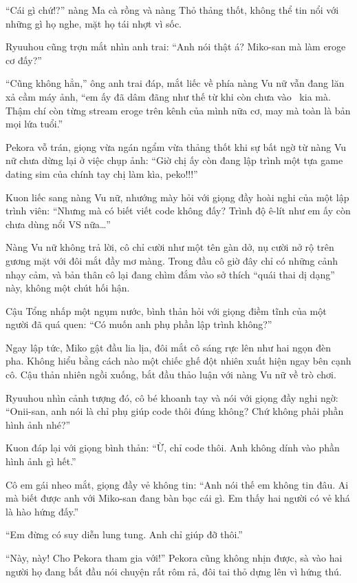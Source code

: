 \documentclass[../main.tex]{subfiles}
\begin{document}
``Cái gì chứ!?'' nàng Ma cà rồng và nàng Thỏ thảng thốt, không thể tin nổi với những gì họ nghe, mặt họ tái nhợt vì sốc.

Ryuuhou cũng trợn mắt nhìn anh trai: ``Anh nói thật á? Miko-san mà làm eroge cơ đấy?''

``Cũng không hẳn,'' ông anh trai đáp, mắt liếc về phía nàng Vu nữ vẫn đang lăn xả cầm máy ảnh, ``em ấy đã dâm đãng như thế từ khi còn chưa vào \hll\ kia mà. Thậm chí còn từng stream eroge trên kênh của mình nữa cơ, may mà toàn là bản mọi lứa tuổi.''

Pekora vỗ trán, giọng vừa ngán ngẩm vừa thảng thốt khi sự bất ngờ từ nàng Vu nữ chưa dừng lại ở việc chụp ảnh: ``Giờ chị ấy còn đang lập trình một tựa game dating sim của chính tay chị làm kìa, peko!!!''


Kuon liếc sang nàng Vu nữ, nhướng mày hỏi với giọng đầy hoài nghi của một lập trình viên: ``Nhưng mà có biết viết code không đấy? Trình độ ê-lít như em ấy còn chưa dùng nổi VS nữa\dots''

Nàng Vu nữ không trả lời, cô chỉ cười như một tên gàn dở, nụ cười nở rộ trên gương mặt với đôi mắt đầy mơ màng. Trong đầu cô giờ đây chỉ có những cảnh nhạy cảm, và bản thân cô lại đang chìm đắm vào sở thích ``quái thai dị dạng'' này, không một chút hối hận.

Cậu Tổng nhấp một ngụm nước, bình thản hỏi với giọng điềm tĩnh của một người đã quá quen: ``Có muốn anh phụ phần lập trình không?''

Ngay lập tức, Miko gật đầu lia lịa, đôi mắt cô sáng rực lên như hai ngọn đèn pha. Không hiểu bằng cách nào một chiếc ghế đột nhiên xuất hiện ngay bên cạnh cô. Cậu thản nhiên ngồi xuống, bắt đầu thảo luận với nàng Vu nữ về trò chơi.

Ryuuhou nhìn cảnh tượng đó, cô bé khoanh tay và nói với giọng đầy nghi ngờ: ``Onii-san, anh nói là chỉ phụ giúp code thôi đúng không? Chứ không phải phần hình ảnh nhé?''

Kuon đáp lại với giọng bình thản: ``Ừ, chỉ code thôi. Anh không dính vào phần hình ảnh gì hết.''

Cô em gái nheo mắt, giọng đầy vẻ không tin: ``Anh nói thế em không tin đâu. Ai mà biết được anh với Miko-san đang bàn bạc cái gì. Em thấy hai người có vẻ khá là hào hứng đấy.''

``Em đừng có suy diễn lung tung. Anh chỉ giúp đỡ thôi.''

``Này, này! Cho Pekora tham gia với!'' Pekora cũng không nhịn được, sà vào hai người họ đang bắt đầu nói chuyện rất rôm rả, đôi tai thỏ dựng lên vì hứng thú.
\end{document}
